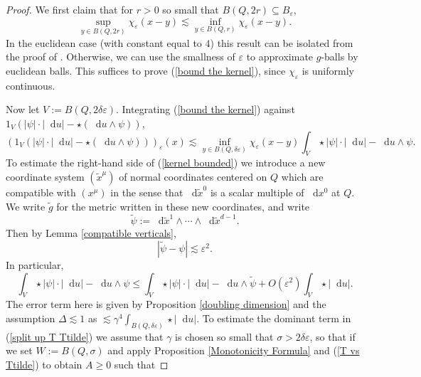 \documentclass[reqno,10pt]{amsart}
\newcommand*\dif{\mathop{}\!\mathrm{d}}
\theoremstyle{definition}
\numberwithin{equation}{section}
\begin{document}
\begin{proof}
We first claim that for $r > 0$ so small that $B(Q, 2r) \subseteq B_\varepsilon$,
\begin{equation}\label{bound the kernel}
\sup_{y \in B(Q, 2r)} \chi_\varepsilon(x - y) \lesssim \inf_{y \in B(Q, r)} \chi_\varepsilon(x - y).
\end{equation}
In the euclidean case (with constant equal to $4$) this result can be isolated from the proof of \cite[Theorem 7.3]{Giusti77}.
Otherwise, we can use the smallness of $\varepsilon$ to approximate $g$-balls by euclidean balls.
This suffices to prove (\ref{bound the kernel}), since $\chi_\varepsilon$ is uniformly continuous.

Now let $V := B(Q, 2\delta\varepsilon)$.
Integrating (\ref{bound the kernel}) against $1_V(|\psi| \cdot |\dif u| - \star(\dif u \wedge \psi))$,
\begin{equation}\label{kernel bounded}
(1_V(|\psi| \cdot |\dif u| - \star(\dif u \wedge \psi)))_\varepsilon(x) \lesssim \inf_{y \in B(Q, \delta\varepsilon)} \chi_\varepsilon(x - y) \int_V \star |\psi| \cdot |\dif u| - \dif u \wedge \psi.
\end{equation}
To estimate the right-hand side of (\ref{kernel bounded}) we introduce a new coordinate system $(\tilde x^\mu)$ of normal coordinates centered on $Q$ which are compatible with $(x^\mu)$ in the sense that $\dif \tilde x^0$ is a scalar multiple of $\dif x^0$ at $Q$.
We write $\tilde g$ for the metric written in these new coordinates, and write
$$\tilde \psi := \dif \tilde x^1 \wedge \cdots \wedge \dif \tilde x^{d - 1}.$$
Then by Lemma \ref{compatible verticals},
\begin{equation}
|\tilde \psi - \psi| \lesssim \varepsilon^2. \label{T vs Ttilde}
\end{equation}
In particular,
\begin{equation}\label{split up T Ttilde}
\int_V \star |\psi| \cdot |\dif u| - \dif u \wedge \psi \leq \int_V \star |\psi| \cdot |\dif u| - \dif u \wedge \tilde \psi + O(\varepsilon^2) \int_V \star |\dif u|.
\end{equation}
The error term here is given by Proposition \ref{doubling dimension} and the assumption $\Delta \lesssim 1$ as $\lesssim \gamma^4 \int_{B(Q, \delta\varepsilon)} \star |\dif u|$.
To estimate the dominant term in (\ref{split up T Ttilde}) we assume that $\gamma$ is chosen so small that $\sigma > 2\delta\varepsilon$, so that if we set $W := B(Q, \sigma)$ and apply Proposition \ref{Monotonicity Formula} and (\ref{T vs Ttilde}) to obtain $A \geq 0$ such that

\end{proof}
\end{document}
